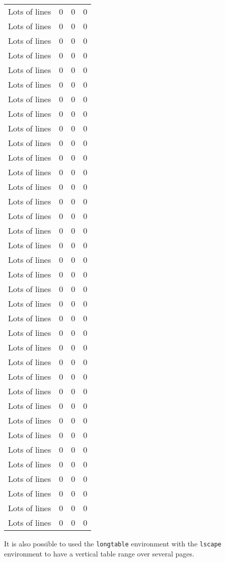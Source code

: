 \begin{longtable}{@{\extracolsep{\fill}}cccc}
Lots of lines & 0 & 0 & 0 \\
Lots of lines & 0 & 0 & 0 \\
Lots of lines & 0 & 0 & 0 \\
Lots of lines & 0 & 0 & 0 \\
Lots of lines & 0 & 0 & 0 \\
Lots of lines & 0 & 0 & 0 \\
Lots of lines & 0 & 0 & 0 \\
Lots of lines & 0 & 0 & 0 \\
Lots of lines & 0 & 0 & 0 \\
Lots of lines & 0 & 0 & 0 \\
Lots of lines & 0 & 0 & 0 \\
Lots of lines & 0 & 0 & 0 \\
Lots of lines & 0 & 0 & 0 \\
Lots of lines & 0 & 0 & 0 \\
Lots of lines & 0 & 0 & 0 \\
Lots of lines & 0 & 0 & 0 \\
Lots of lines & 0 & 0 & 0 \\
Lots of lines & 0 & 0 & 0 \\
Lots of lines & 0 & 0 & 0 \\
Lots of lines & 0 & 0 & 0 \\
Lots of lines & 0 & 0 & 0 \\
Lots of lines & 0 & 0 & 0 \\
Lots of lines & 0 & 0 & 0 \\
Lots of lines & 0 & 0 & 0 \\
Lots of lines & 0 & 0 & 0 \\
Lots of lines & 0 & 0 & 0 \\
Lots of lines & 0 & 0 & 0 \\
Lots of lines & 0 & 0 & 0 \\
Lots of lines & 0 & 0 & 0 \\
Lots of lines & 0 & 0 & 0 \\
Lots of lines & 0 & 0 & 0 \\
Lots of lines & 0 & 0 & 0 \\
Lots of lines & 0 & 0 & 0 \\
Lots of lines & 0 & 0 & 0 \\
Lots of lines & 0 & 0 & 0 \\
Lots of lines & 0 & 0 & 0 \\
%
\end{longtable}

It is also possible to used the \verb+longtable+ environment with the \verb+lscape+ environment to have a vertical table range over several pages.
